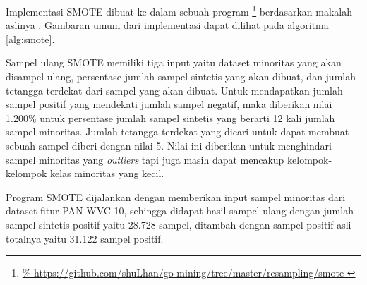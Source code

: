 Implementasi SMOTE dibuat ke dalam sebuah program
\footnote{\url{%
https://github.com/shuLhan/go-mining/tree/master/resampling/smote
}}
berdasarkan makalah aslinya \cite{chawla2002smote}.
Gambaran umum dari implementasi dapat dilihat pada algoritma \ref{alg:smote}.

Sampel ulang SMOTE memiliki tiga input yaitu dataset minoritas yang akan
disampel ulang, persentase jumlah sampel sintetis yang akan
dibuat, dan jumlah tetangga terdekat dari sampel yang akan
dibuat.
Untuk mendapatkan jumlah sampel positif yang mendekati jumlah sampel negatif,
maka diberikan nilai 1.200\% untuk persentase jumlah sampel sintetis yang
berarti 12 kali jumlah sampel minoritas.
Jumlah tetangga terdekat yang dicari untuk dapat membuat sebuah sampel diberi
dengan nilai 5.
Nilai ini diberikan untuk menghindari sampel minoritas yang \textit{outliers}
tapi juga masih dapat mencakup kelompok-kelompok kelas minoritas yang kecil.

Program SMOTE dijalankan dengan memberikan input sampel minoritas dari dataset
fitur PAN-WVC-10, sehingga didapat hasil sampel ulang dengan jumlah sampel
sintetis positif yaitu 28.728 sampel, ditambah dengan sampel positif asli
totalnya yaitu 31.122 sampel positif.
